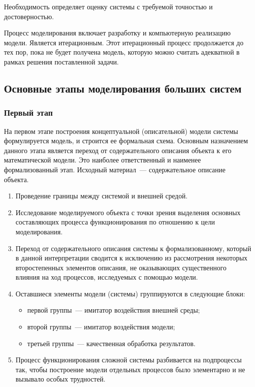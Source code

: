 Необходимость определяет оценку системы с требуемой точностью и достоверностью.

Процесс моделирования включает разработку и компьютерную реализацию модели. Является итерационным. Этот итерационный процесс продолжается до тех пор, пока не будет получена модель, которую можно считать адекватной в рамках решения поставленной задачи.

\subsection{Основные этапы моделирования больших систем}

\subsubsection{Первый этап}

На первом этапе построения концептуальной (описательной) модели системы формулируется модель, и строится ее формальная схема. Основным назначением данного этапа является переход от содержательного описания объекта к его математической модели. Это наиболее ответственный и наименее формализованный этап. Исходный материал~--- содержательное описание объекта.

\begin{enumerate}
    \item Проведение границы между системой и внешней средой.
    \item Исследование моделируемого объекта с точки зрения выделения основных составляющих процесса функционирования по отношению к цели моделирования.
    \item Переход от содержательного описания системы к формализованному, который в данной интерпретации сводится к исключению из рассмотрения некоторых второстепенных элементов описания, не оказывающих существенного влияния на ход процессов, исследуемых с помощью модели.
    \item Оставшиеся элементы модели (системы) группируются в следующие блоки:
          \begin{itemize}
              \item первой группы~--- имитатор воздействия внешней среды;
              \item второй группы~--- имитатор воздействия модели;
              \item третьей группы~--- качественная обработка результатов.
          \end{itemize}
    \item Процесс функционирования сложной системы разбивается на подпроцессы так, чтобы построение модели отдельных процессов было элементарно и не вызывало особых трудностей.
\end{enumerate}

